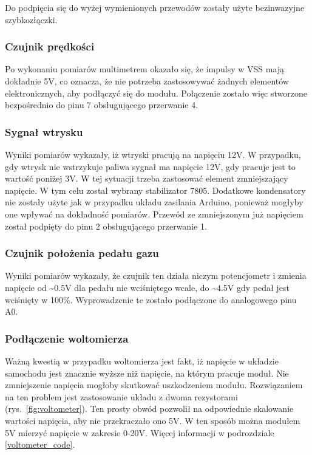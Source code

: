 Do podpięcia się do wyżej wymienionych przewodów zostały użyte bezinwazyjne szybkozłączki. 

\subsubsection{Czujnik prędkości} \label{vss}
Po wykonaniu pomiarów multimetrem okazało się, że impulsy w VSS mają dokładnie 5V, co oznacza, że nie potrzeba zastosowywać żadnych elementów elektronicznych, aby podłączyć się do modułu. Połączenie zostało więc stworzone bezpośrednio do pinu 7 obsługującego przerwanie 4.

\subsubsection{Sygnał wtrysku} \label{inj}
Wyniki pomiarów wykazały, iż wtryski pracują na napięciu 12V. W przypadku, gdy wtrysk nie wstrzykuje paliwa sygnał ma napięcie 12V, gdy pracuje jest to wartość poniżej 3V. W tej sytuacji trzeba zastosować element zmniejszający napięcie. W tym celu został wybrany stabilizator 7805. Dodatkowe kondensatory nie zostały użyte jak w przypadku układu zasilania Arduino, ponieważ mogłyby one wpływać na dokładność pomiarów. Przewód ze zmniejszonym już napięciem został podpięty do pinu 2 obsługującego przerwanie 1.

\subsubsection{Czujnik położenia pedału gazu}
Wyniki pomiarów wykazały, że czujnik ten działa niczym potencjometr i zmienia napięcie od \textasciitilde0.5V dla pedału nie wciśniętego wcale, do \textasciitilde4.5V gdy pedał jest wciśnięty w 100\%. Wyprowadzenie te zostało podłączone do analogowego pinu A0.

\subsubsection{Podłączenie woltomierza} \label{voltometer}

Ważną kwestią w przypadku woltomierza jest fakt, iż napięcie w układzie samochodu jest znacznie wyższe niż napięcie, na którym pracuje moduł. Nie zmniejszenie napięcia mogłoby skutkować uszkodzeniem modułu. Rozwiązaniem na ten problem jest zastosowanie układu z dwoma rezystorami (rys.~\ref{fig:voltometer}). Ten prosty obwód pozwolił na odpowiednie skalowanie wartości napięcia, aby nie przekraczało ono 5V. 
W ten sposób można modułem 5V mierzyć napięcie w zakresie 0-20V. Więcej informacji w podrozdziale \ref{voltometer_code}.

